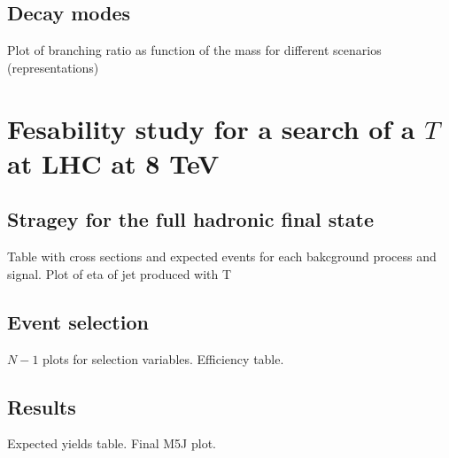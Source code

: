 \subsection{Decay modes}
\label{sec:decay}

\begin{TOINCLUDE}Plot of branching ratio as function of the mass for different scenarios (representations)\end{TOINCLUDE}

\section{Fesability study for a search of a $T$ at LHC at 8 TeV}
\label{sec:pheno}

\subsection{Stragey for the full hadronic final state}
\label{sec:Pstra}

\begin{TOINCLUDE}Table with cross sections and expected events for each bakcground process and signal. Plot of eta of jet produced with T\end{TOINCLUDE}

\subsection{Event selection}
\label{sec:Psel}

\begin{TOINCLUDE}$N-1$ plots for selection variables. Efficiency table.\end{TOINCLUDE}

\subsection{Results}
\label{sec:Pres}

\begin{TOINCLUDE}Expected yields table. Final M5J plot.\end{TOINCLUDE}